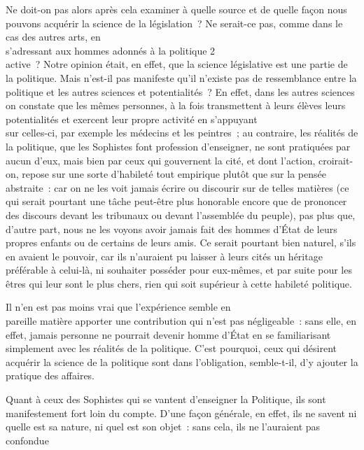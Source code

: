 \documentclass[french,twoside]{book} %
\begin{document}
Ne doit-on pas alors après cela examiner à quelle source et de quelle façon nous pouvons acquérir la science de la législation ? Ne serait-ce pas, comme dans le cas des autres arts, en \\
s’adressant aux hommes adonnés à la politique 2\\
active ? Notre opinion était, en effet, que la science législative est une partie de la politique. Mais n’est-il pas manifeste qu’il n’existe pas de ressemblance entre la politique et les autres sciences et potentialités ? En effet, dans les autres sciences on constate que les mêmes personnes, à la fois transmettent à leurs élèves leurs potentialités et exercent leur propre activité en s’appuyant \\
sur celles-ci, par exemple les médecins et les peintres ; au contraire, les réalités de la politique, que les Sophistes font  profession d’enseigner, ne sont pratiquées par aucun d’eux, mais bien par ceux qui gouvernent la cité, et dont l’action, croirait-on, repose sur une sorte d’habileté tout empirique plutôt que sur la pensée abstraite : car on ne les voit jamais écrire ou discourir sur de telles matières (ce qui serait pourtant une tâche peut-être plus honorable encore que de prononcer \\
des discours devant les tribunaux ou devant l’assemblée du peuple), pas plus que, d’autre part, nous ne les voyons avoir jamais fait des hommes d’État de leurs propres enfants ou de certains de leurs amis. Ce serait pourtant bien naturel, s’ils en avaient le pouvoir, car ils n’auraient pu laisser à leurs cités un héritage préférable à celui-là, ni souhaiter posséder pour eux-mêmes, et par suite pour les êtres qui leur sont le plus chers, rien qui soit supérieur à cette habileté politique.\par
Il n’en est pas moins vrai que l’expérience semble en \\
pareille matière apporter une contribution qui n’est pas négligeable : sans elle, en effet, jamais personne ne pourrait devenir homme d’État en se familiarisant simplement avec les réalités de la politique. C’est pourquoi, ceux qui désirent acquérir la science de la politique sont dans l’obligation, semble-t-il, d’y ajouter la pratique des affaires.\par
Quant à ceux des Sophistes qui se vantent d’enseigner la Politique, ils sont manifestement fort loin du compte. D’une façon générale, en effet, ils ne savent ni quelle est sa nature, ni quel est son objet : sans cela, ils ne l’auraient pas confondue \\
\end{document}
